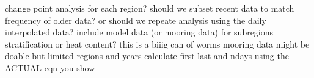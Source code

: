 \markdownRendererDocumentBegin
\markdownRendererUlBeginTight
\markdownRendererUlItem change point analysis for each region?\markdownRendererUlItemEnd 
\markdownRendererUlItem should we subset recent data to match frequency of older data? or should we repeate analysis using the daily interpolated data?\markdownRendererUlItemEnd 
\markdownRendererUlItem include model data (or mooring data) for subregions stratification or heat content? this is a biiig can of worms\markdownRendererUlItemEnd 
\markdownRendererUlItem mooring data might be doable but limited regions and years\markdownRendererUlItemEnd 
\markdownRendererUlItem calculate first last and ndays using the ACTUAL eqn you show\markdownRendererUlItemEnd 
\markdownRendererUlEndTight \markdownRendererDocumentEnd
